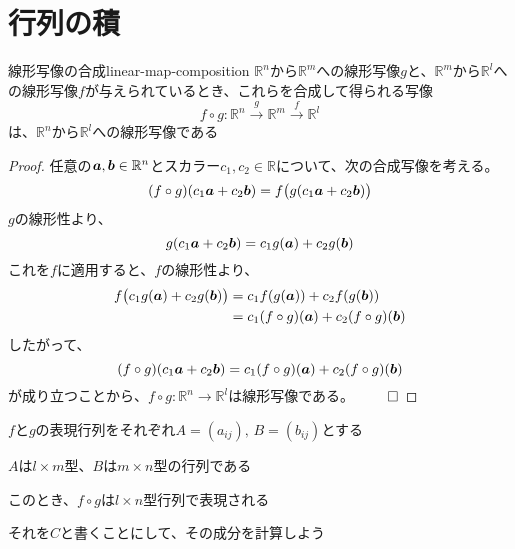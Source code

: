 \documentclass[../../../topic_linear-algebra]{subfiles}
\begin{document}
\sectionline
\section{行列の積}

\begin{theorem}{線形写像の合成}{linear-map-composition}
  $\mathbb{R}^n$から$\mathbb{R}^m$への線形写像$g$と、$\mathbb{R}^m$から$\mathbb{R}^l$への線形写像$f$が与えられているとき、これらを合成して得られる写像
  \begin{equation*}
    f \circ g\colon \mathbb{R}^n \xrightarrow{g} \mathbb{R}^m \xrightarrow{f} \mathbb{R}^l
  \end{equation*}
  は、$\mathbb{R}^n$から$\mathbb{R}^l$への線形写像である
\end{theorem}

\begin{proof}
  任意の$\vb*{a},\vb*{b} \in \mathbb{R}^n$とスカラー$c_1,c_2 \in \mathbb{R}$について、次の合成写像を考える。
  \begin{equation*}
    (f \circ g)(c_1\vb*{a}+c_2\vb*{b}) = f\bigl(g(c_1\vb*{a}+c_2\vb*{b})\bigr)
  \end{equation*}
  $g$の線形性より、
  \begin{equation*}
    g(c_1\vb*{a}+c_2\vb*{b}) = c_1 g(\vb*{a}) + c_2 g(\vb*{b})
  \end{equation*}
  これを$f$に適用すると、$f$の線形性より、
  \begin{align*}
    f\bigl(c_1 g(\vb*{a}) + c_2 g(\vb*{b})\bigr) &= c_1 f(g(\vb*{a})) + c_2 f(g(\vb*{b})) \\
    &= c_1(f \circ g)(\vb*{a}) + c_2(f \circ g)(\vb*{b})
  \end{align*}
  したがって、
  \begin{equation*}
    (f \circ g)(c_1\vb*{a}+c_2\vb*{b}) = c_1(f \circ g)(\vb*{a}) + c_2(f \circ g)(\vb*{b})
  \end{equation*}
  が成り立つことから、$f \circ g \colon \mathbb{R}^n \to \mathbb{R}^l$は線形写像である。 $\qed$
\end{proof}

$f$と$g$の表現行列をそれぞれ$A = (a_{ij}), \, B = (b_{ij})$とする

$A$は$l \times m$型、$B$は$m \times n$型の行列である

\br

このとき、$f \circ g$は$l \times n$型行列で表現される

それを$C$と書くことにして、その成分を計算しよう
\end{document}
